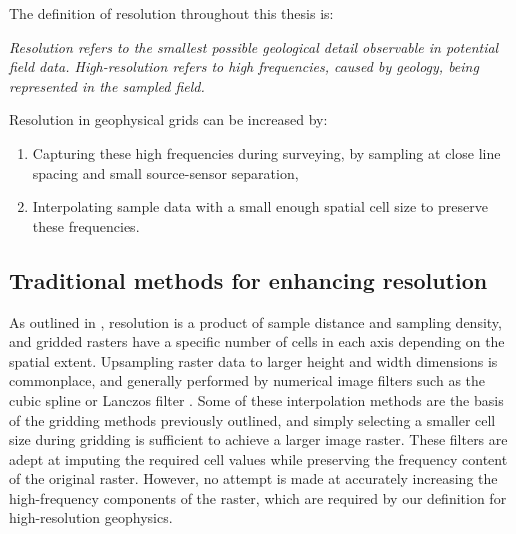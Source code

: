 The definition of resolution throughout this thesis is:

\bigskip{}
\noindent{}\emph{Resolution refers to the smallest possible geological detail observable in potential field data. High-resolution refers to high frequencies, caused by geology, being represented in the sampled field.}

\bigskip{}
Resolution in geophysical grids can be increased by:
\begin{enumerate}
    \item{} Capturing these high frequencies during surveying, by sampling at close line spacing and small source-sensor separation,
    \item{} Interpolating sample data with a small enough spatial cell size to preserve these frequencies.
\end{enumerate}

%

\subsection{Traditional methods for enhancing resolution}
As outlined in , resolution is a product of sample distance and sampling density, and gridded rasters have a specific number of cells in each axis depending on the spatial extent.
Upsampling raster data to larger height and width dimensions is commonplace, and generally performed by numerical image filters such as the cubic spline \parencite{keysCubicConvolutionInterpolation1981} or Lanczos filter \parencite{lanczos1988applied}.
Some of these interpolation methods are the basis of the gridding methods previously outlined, and simply selecting a smaller cell size during gridding is sufficient to achieve a larger image raster.
These filters are adept at imputing the required cell values while preserving the frequency content of the original raster.
However, no attempt is made at accurately increasing the high-frequency components of the raster, which are required by our definition for high-resolution geophysics.

